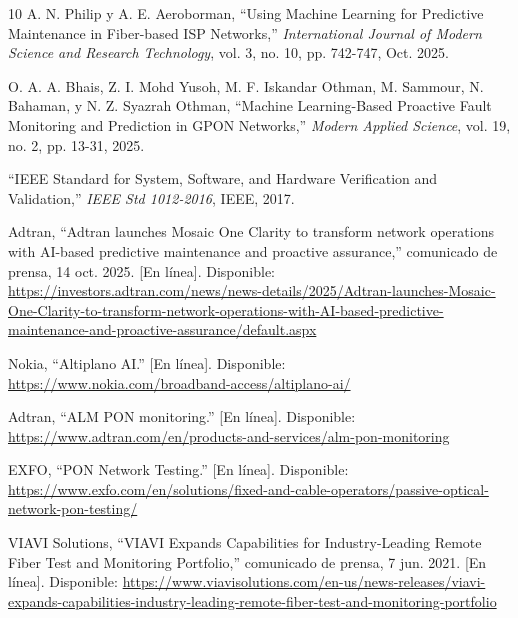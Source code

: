 \documentclass[12pt,a4paper]{article}
\begin{document}
\begin{thebibliography}{10}
A. N. Philip y A. E. Aeroborman, ``Using Machine Learning for Predictive Maintenance in Fiber-based ISP Networks,'' \textit{International Journal of Modern Science and Research Technology}, vol. 3, no. 10, pp. 742-747, Oct. 2025.

O. A. A. Bhais, Z. I. Mohd Yusoh, M. F. Iskandar Othman, M. Sammour, N. Bahaman, y N. Z. Syazrah Othman, ``Machine Learning-Based Proactive Fault Monitoring and Prediction in GPON Networks,'' \textit{Modern Applied Science}, vol. 19, no. 2, pp. 13-31, 2025.

``IEEE Standard for System, Software, and Hardware Verification and Validation,'' \textit{IEEE Std 1012-2016}, IEEE, 2017.

Adtran, ``Adtran launches Mosaic One Clarity to transform network operations with AI-based predictive maintenance and proactive assurance,'' comunicado de prensa, 14 oct. 2025. [En línea]. Disponible: {\expandafter\def\expandafter\UrlBreaks\expandafter{\UrlBreaks\do-}\url{https://investors.adtran.com/news/news-details/2025/Adtran-launches-Mosaic-One-Clarity-to-transform-network-operations-with-AI-based-predictive-maintenance-and-proactive-assurance/default.aspx}}

Nokia, ``Altiplano AI.'' [En línea]. Disponible: \url{https://www.nokia.com/broadband-access/altiplano-ai/}

Adtran, ``ALM PON monitoring.'' [En línea]. Disponible: \url{https://www.adtran.com/en/products-and-services/alm-pon-monitoring}

EXFO, ``PON Network Testing.'' [En línea]. Disponible: \url{https://www.exfo.com/en/solutions/fixed-and-cable-operators/passive-optical-network-pon-testing/}

VIAVI Solutions, ``VIAVI Expands Capabilities for Industry-Leading Remote Fiber Test and Monitoring Portfolio,'' comunicado de prensa, 7 jun. 2021. [En línea]. Disponible: {\expandafter\def\expandafter\UrlBreaks\expandafter{\UrlBreaks\do-}\url{https://www.viavisolutions.com/en-us/news-releases/viavi-expands-capabilities-industry-leading-remote-fiber-test-and-monitoring-portfolio}}

\end{thebibliography}
\end{document}
